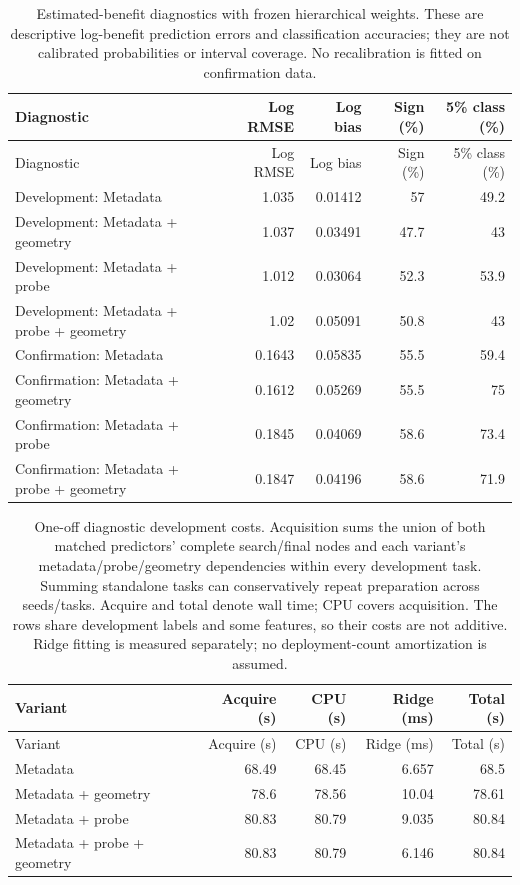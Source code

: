 {\small\setlength{\tabcolsep}{4pt}
\begin{longtable}{lrrrr}
\caption{Estimated-benefit diagnostics with frozen hierarchical weights. These are descriptive log-benefit prediction errors and classification accuracies; they are not calibrated probabilities or interval coverage. No recalibration is fitted on confirmation data.}\label{tab:diagnostic-calibration}\\
\toprule
Diagnostic & Log RMSE & Log bias & Sign (\%) & 5\% class (\%) \\
\midrule
\endfirsthead
\toprule
Diagnostic & Log RMSE & Log bias & Sign (\%) & 5\% class (\%) \\
\midrule
\endhead
Development: Metadata & 1.035 & 0.01412 & 57 & 49.2 \\
Development: Metadata + geometry & 1.037 & 0.03491 & 47.7 & 43 \\
Development: Metadata + probe & 1.012 & 0.03064 & 52.3 & 53.9 \\
Development: Metadata + probe + geometry & 1.02 & 0.05091 & 50.8 & 43 \\
Confirmation: Metadata & 0.1643 & 0.05835 & 55.5 & 59.4 \\
Confirmation: Metadata + geometry & 0.1612 & 0.05269 & 55.5 & 75 \\
Confirmation: Metadata + probe & 0.1845 & 0.04069 & 58.6 & 73.4 \\
Confirmation: Metadata + probe + geometry & 0.1847 & 0.04196 & 58.6 & 71.9 \\
\bottomrule
\end{longtable}
}

{\small\setlength{\tabcolsep}{4pt}
\begin{longtable}{lrrrr}
\caption{One-off diagnostic development costs. Acquisition sums the union of both matched predictors' complete search/final nodes and each variant's metadata/probe/geometry dependencies within every development task. Summing standalone tasks can conservatively repeat preparation across seeds/tasks. Acquire and total denote wall time; CPU covers acquisition. The rows share development labels and some features, so their costs are not additive. Ridge fitting is measured separately; no deployment-count amortization is assumed.}\label{tab:offline-costs}\\
\toprule
Variant & Acquire (s) & CPU (s) & Ridge (ms) & Total (s) \\
\midrule
\endfirsthead
\toprule
Variant & Acquire (s) & CPU (s) & Ridge (ms) & Total (s) \\
\midrule
\endhead
Metadata & 68.49 & 68.45 & 6.657 & 68.5 \\
Metadata + geometry & 78.6 & 78.56 & 10.04 & 78.61 \\
Metadata + probe & 80.83 & 80.79 & 9.035 & 80.84 \\
Metadata + probe + geometry & 80.83 & 80.79 & 6.146 & 80.84 \\
\bottomrule
\end{longtable}
}

